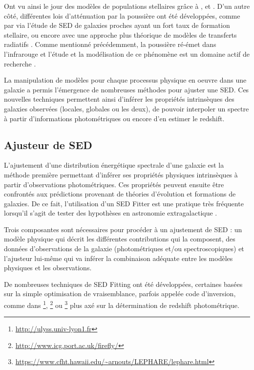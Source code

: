\documentclass[../main/main.tex]{subfiles}
\begin{document}
Ont vu ainsi le jour des modèles de populations stellaires grâce à
\citet{Fioc1997}, \citet{BruzualCharlot2003} et \citet{Maraston2005}.
D'un autre côté, différentes lois d'atténuation par la poussière ont été
développées, comme par \citet{Calzetti1994,Calzetti2000} via l'étude de SED de
galaxies proches ayant un fort taux de formation stellaire, ou encore
avec une approche plus théorique de modèles de transferts radiatifs
\citep{WittGordon}.
Comme mentionné précédemment, la poussière ré-émet dans l'infrarouge et
l'étude et la modélisation de ce phénomène est un domaine actif de
recherche \citep{CharyElbaz, Draine2007,Casey2012, Dale2014, Leja2017 }.

La manipulation de modèles pour chaque processus physique en oeuvre dans
une galaxie a permis l'émergence de nombreuses méthodes pour ajuster une
SED. Ces nouvelles techniques permettent ainsi d'inférer les propriétés intrinsèques des galaxies
observées (locales, globales ou les deux), de pouvoir interpoler un
spectre à partir d'informations photométriques ou encore d'en estimer le
redshift.

\subsection{Ajusteur de SED}

L'ajustement d'une distribution énergétique spectrale d'une galaxie est la
méthode première permettant d'inférer ses propriétés physiques intrinsèques à
partir d'observations photométriques. Ces propriétés peuvent ensuite être confrontés
aux prédictions provenant de théories d'évolution et formations de
galaxies. De ce fait, l'utilisation d'un SED Fitter est une pratique très
fréquente
lorsqu'il s'agit de tester des hypothèses en astronomie extragalactique
\citep{Tinsley1980, Walcher2011, Conroy2013, Chevallard2016, Briday22}. 

Trois composantes sont nécessaires pour procéder à un ajustement de SED : un
modèle physique qui décrit les différentes contributions qui la
composent, des données d'observations de la galaxie (photométriques
et/ou spectroscopiques) et l'ajusteur lui-même qui va inférer la
combinaison adéquate entre les modèles physiques et les observations.

De nombreuses techniques de SED Fitting ont été développées, certaines
basées sur 
la simple optimisation de vraisemblance, parfois appelée code
d'inversion, comme dans \footnote{\url{http://ulyss.univ-lyon1.fr}}\citep{KolevaUlyss}, \footnote{\url{http://www.icg.port.ac.uk/firefly/}}
\citep{WilkinsonFirefly} ou \footnote{\url{https://www.cfht.hawaii.edu/~arnouts/LEPHARE/lephare.html}} \citep{ArnoutsLephare} plus
axé sur la détermination de redshift photométrique.
\end{document}
